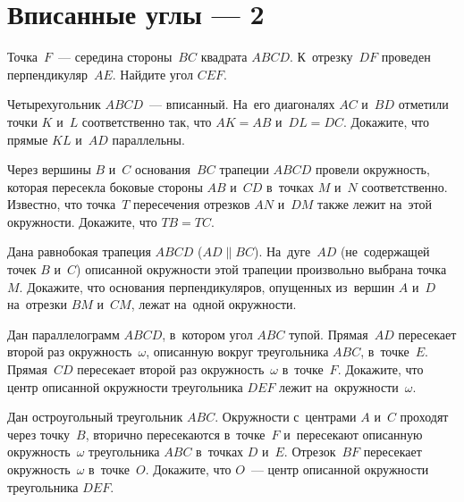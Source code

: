 
\section*{Вписанные углы --- 2}


\begin{problems}

\item
Точка~$F$~--- середина стороны~$BC$ квадрата $ABCD$.
К~отрезку~$DF$ проведен перпендикуляр~$AE$.
Найдите угол $CEF$.

\item
Четырехугольник $ABCD$~--- вписанный.
На~его диагоналях $AC$ и~$BD$ отметили точки $K$ и~$L$ соответственно так, что
$AK = AB$ и~$DL = DC$.
Докажите, что прямые $KL$ и~$AD$ параллельны.

\item
Через вершины $B$ и~$C$ основания~$BC$ трапеции $ABCD$ провели окружность,
которая пересекла боковые стороны $AB$ и~$CD$ в~точках $M$ и~$N$
соответственно.
Известно, что точка~$T$ пересечения отрезков $AN$ и~$DM$ также лежит на~этой
окружности.
Докажите, что $TB = TC$.

\item
Дана равнобокая трапеция $ABCD$ ($AD \parallel BC$).
На~дуге~$AD$ (не~содержащей точек $B$ и~$C$) описанной окружности этой трапеции
произвольно выбрана точка~$M$.
Докажите, что основания перпендикуляров, опущенных из~вершин $A$ и~$D$
на~отрезки $BM$ и~$CM$, лежат на~одной окружности.

\item
Дан параллелограмм $ABCD$, в~котором угол $ABC$ тупой.
Прямая~$AD$ пересекает второй раз окружность~$\omega$, описанную вокруг
треугольника $ABC$, в~точке~$E$.
Прямая~$CD$ пересекает второй раз окружность~$\omega$ в~точке~$F$.
Докажите, что центр описанной окружности треугольника $DEF$ лежит
на~окружности~$\omega$.

\item
Дан остроугольный треугольник $ABC$.
Окружности с~центрами $A$ и~$C$ проходят через точку~$B$, вторично пересекаются
в~точке~$F$ и~пересекают описанную окружность~$\omega$ треугольника $ABC$
в~точках $D$ и~$E$.
Отрезок~$BF$ пересекает окружность~$\omega$ в~точке~$O$.
Докажите, что $O$~--- центр описанной окружности треугольника $DEF$.

\end{problems}

